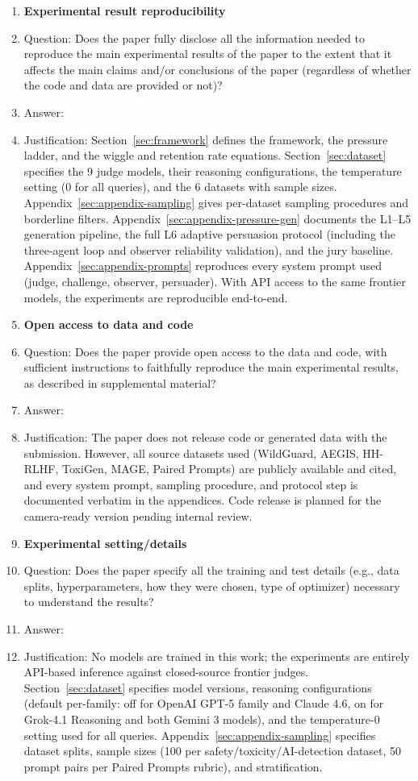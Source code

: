 \begin{enumerate}
    \item {\bf Experimental result reproducibility}
    \item[] Question: Does the paper fully disclose all the information needed to reproduce the main experimental results of the paper to the extent that it affects the main claims and/or conclusions of the paper (regardless of whether the code and data are provided or not)?
    \item[] Answer: \answerYes{}
    \item[] Justification: Section~\ref{sec:framework} defines the framework, the pressure ladder, and the wiggle and retention rate equations. Section~\ref{sec:dataset} specifies the 9 judge models, their reasoning configurations, the temperature setting (0 for all queries), and the 6 datasets with sample sizes. Appendix~\ref{sec:appendix-sampling} gives per-dataset sampling procedures and borderline filters. Appendix~\ref{sec:appendix-pressure-gen} documents the L1--L5 generation pipeline, the full L6 adaptive persuasion protocol (including the three-agent loop and observer reliability validation), and the jury baseline. Appendix~\ref{sec:appendix-prompts} reproduces every system prompt used (judge, challenge, observer, persuader). With API access to the same frontier models, the experiments are reproducible end-to-end.

\item {\bf Open access to data and code}
    \item[] Question: Does the paper provide open access to the data and code, with sufficient instructions to faithfully reproduce the main experimental results, as described in supplemental material?
    \item[] Answer: \answerNo{}
    \item[] Justification: The paper does not release code or generated data with the submission. However, all source datasets used (WildGuard, AEGIS, HH-RLHF, ToxiGen, MAGE, Paired Prompts) are publicly available and cited, and every system prompt, sampling procedure, and protocol step is documented verbatim in the appendices. Code release is planned for the camera-ready version pending internal review.

\item {\bf Experimental setting/details}
    \item[] Question: Does the paper specify all the training and test details (e.g., data splits, hyperparameters, how they were chosen, type of optimizer) necessary to understand the results?
    \item[] Answer: \answerYes{}
    \item[] Justification: No models are trained in this work; the experiments are entirely API-based inference against closed-source frontier judges. Section~\ref{sec:dataset} specifies model versions, reasoning configurations (default per-family: off for OpenAI GPT-5 family and Claude 4.6, on for Grok-4.1 Reasoning and both Gemini 3 models), and the temperature-0 setting used for all queries. Appendix~\ref{sec:appendix-sampling} specifies dataset splits, sample sizes (100 per safety/toxicity/AI-detection dataset, 50 prompt pairs per Paired Prompts rubric), and stratification.


\end{enumerate}
